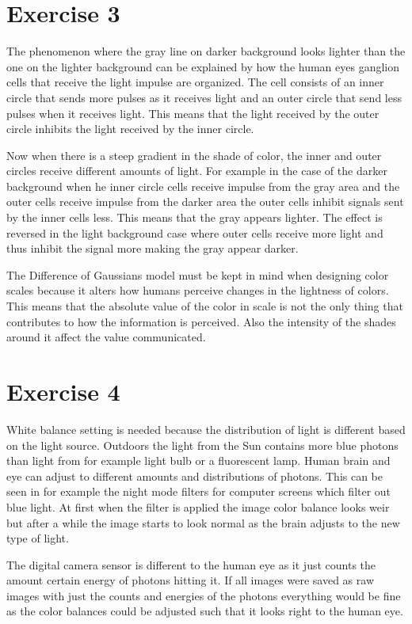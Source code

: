 \documentclass{article}
\begin{document}
\section*{Exercise 3}

The phenomenon where the gray line on darker background looks lighter than the one on the lighter background can be explained by how the human eyes ganglion cells that receive the light impulse are organized. The cell consists of an inner circle that sends more pulses as it receives light and an outer circle that send less pulses when it receives light. This means that the light received by the outer circle inhibits the light received by the inner circle.

Now when there is a steep gradient in the shade of color, the inner and outer circles receive different amounts of light. For example in the case of the darker background when he inner circle cells receive impulse from the gray area and the outer cells receive impulse from the darker area the outer cells inhibit signals sent by the inner cells less. This means that the gray appears lighter. The effect is reversed in the light background case where outer cells receive more light and thus inhibit the signal more making the gray appear darker.

The Difference of Gaussians model must be kept in mind when designing color scales because it alters how humans perceive changes in the lightness of colors. This means that the absolute value of the color in scale is not the only thing that contributes to how the information is perceived. Also the intensity of the shades around it affect the value communicated.  

\section*{Exercise 4}

White balance setting is needed because the distribution of light is different based on the light source. Outdoors the light from the Sun contains more blue photons than light from for example light bulb or a fluorescent lamp. Human brain and eye can adjust to different amounts and distributions of photons. This can be seen in for example the night mode filters for computer screens which filter out blue light. At first when the filter is applied the image color balance looks weir but after a while the image starts to look normal as the brain adjusts to the new type of light.

The digital camera sensor is different to the human eye as it just counts the amount certain energy of photons hitting it. If all images were saved as raw images with just the counts and energies of the photons everything would be fine as the color balances could be adjusted such that it looks right to the human eye. 
\end{document}
